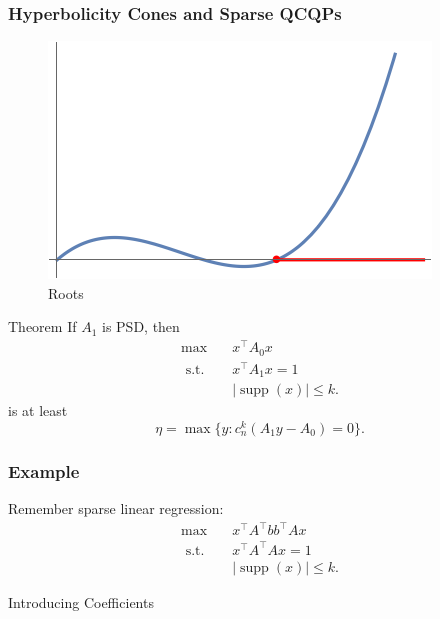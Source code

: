 \documentclass{beamer}
\DeclareMathOperator*{\supp}{supp}
\newcommand{\st}{{\text{ s.t. }}}
\begin{document}
\begin{frame}
    \frametitle{Hyperbolicity Cones and Sparse QCQPs}
    \begin{figure}[htpb]
        \centering
        \includegraphics[width=0.8\linewidth]{roots.png}
        \caption{Roots}%
        \label{fig:roots}
    \end{figure}
\end{frame}
\begin{frame}
    \begin{block}{Theorem}
        If $A_1$ is PSD, then
        \begin{equation*}
            \begin{aligned}
                \max\quad & x^{\intercal}A_0x\\
                \st & x^{\intercal}A_1x = 1\\
                    &|\supp(x)| \le k.
            \end{aligned}
        \end{equation*}
        is at least 
        \[
            \eta = \max \{y : c_n^k(A_1y-A_0) = 0 \}.
        \]
    \end{block}
\end{frame}
\begin{frame}
    \frametitle{Example}
    Remember sparse linear regression:
    \begin{equation*}
        \begin{aligned}
        \max\quad & x^{\intercal}A^{\intercal}bb^{\intercal}Ax\\
        \st & x^{\intercal}A^{\intercal}Ax = 1\\
            & |\supp(x)| \le k.
        \end{aligned}
    \end{equation*}
\end{frame}
\begin{frame}
    \centering
    \huge
    {\color{gray}Introducing Coefficients}
\end{frame}
\end{document}
